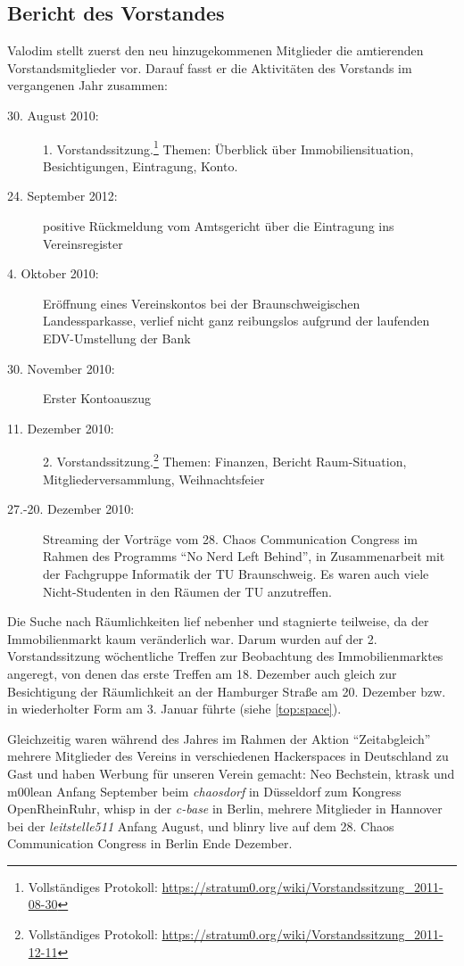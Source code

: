 \documentclass[a4paper,12pt]{scrartcl}
\begin{document}
\subsection{Bericht des Vorstandes}
Valodim stellt zuerst den neu hinzugekommenen Mitglieder die amtierenden
Vorstandsmitglieder vor. Darauf fasst er die Aktivitäten des Vorstands im
vergangenen Jahr zusammen:
\begin{description}
  \item[30. August 2010:] 1. Vorstandssitzung.\footnote{Vollständiges Protokoll:
    \url{https://stratum0.org/wiki/Vorstandssitzung\_2011-08-30}}
    Themen: Überblick über Immobiliensituation, Besichtigungen, Eintragung,
    Konto.
  \item[24. September 2012:] positive Rückmeldung vom Amtsgericht über die
    Eintragung ins Vereinsregister
  \item[4. Oktober 2010:] Eröffnung eines Vereinskontos bei der
    Braunschweigischen Landessparkasse, verlief nicht ganz reibungslos aufgrund
    der laufenden EDV-Umstellung der Bank
  \item[30. November 2010:] Erster Kontoauszug
  \item[11. Dezember 2010:] 2. Vorstandssitzung.\footnote{Vollständiges
    Protokoll: \url{https://stratum0.org/wiki/Vorstandssitzung\_2011-12-11}}
    Themen: Finanzen, Bericht Raum-Situation, Mitgliederversammlung,
    Weihnachtsfeier
  \item[27.-20. Dezember 2010:] Streaming der Vorträge vom 28. Chaos
    Communication Congress im Rahmen des Programms "`No Nerd Left Behind"', in
    Zusammenarbeit mit der Fachgruppe Informatik der TU Braunschweig. Es waren
    auch viele Nicht-Studenten in den Räumen der TU anzutreffen.
\end{description}

Die Suche nach Räumlichkeiten lief nebenher und stagnierte teilweise, da der
Immobilienmarkt kaum veränderlich war. Darum wurden auf der 2. Vorstandssitzung
wöchentliche Treffen zur Beobachtung des Immobilienmarktes angeregt, von denen
das erste Treffen am 18. Dezember auch gleich zur Besichtigung der Räumlichkeit
an der Hamburger Straße am 20. Dezember bzw. in wiederholter Form am 3. Januar
führte (siehe \ref{top:space}).

Gleichzeitig waren während des Jahres im Rahmen der Aktion "`Zeitabgleich"'
mehrere Mitglieder des Vereins in verschiedenen Hackerspaces in Deutschland zu
Gast und haben Werbung für unseren Verein gemacht: Neo Bechstein, ktrask und
m00lean Anfang September beim \emph{chaosdorf} in Düsseldorf zum Kongress
OpenRheinRuhr, whisp in der \emph{c-base} in Berlin, mehrere Mitglieder in
Hannover bei der \emph{leitstelle511} Anfang August, und blinry live auf dem
28. Chaos Communication Congress in Berlin Ende Dezember.
\end{document}
